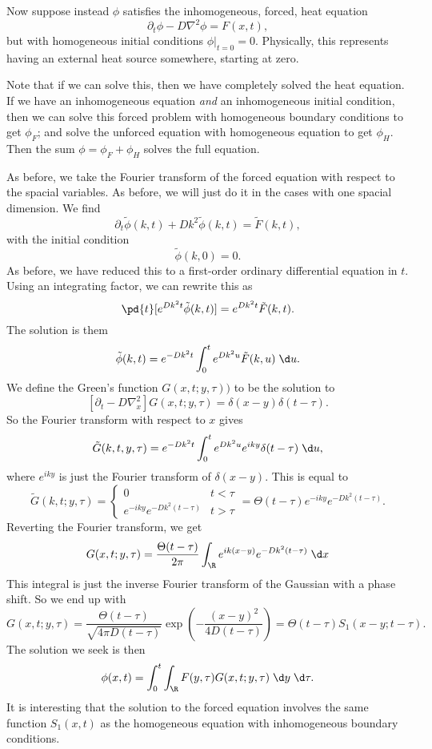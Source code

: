 \documentclass[a4paper]{article}
\begin{document}
Now suppose instead $\phi$ satisfies the inhomogeneous, forced, heat equation
\[
  \partial_t \phi - D \nabla^2 \phi = F(x, t),
\]
but with homogeneous initial conditions $\phi|_{t = 0} = 0$. Physically, this represents having an external heat source somewhere, starting at zero.

Note that if we can solve this, then we have completely solved the heat equation. If we have an inhomogeneous equation \emph{and} an inhomogeneous initial condition, then we can solve this forced problem with homogeneous boundary conditions to get $\phi_F$; and solve the unforced equation with homogeneous equation to get $\phi_H$. Then the sum $\phi = \phi_F + \phi_H$ solves the full equation.

As before, we take the Fourier transform of the forced equation with respect to the spacial variables. As before, we will just do it in the cases with one spacial dimension. We find
\[
  \partial_t \tilde{\phi}(k, t) + Dk^2 \tilde{\phi}(k, t) = \tilde{F}(k, t),
\]
with the initial condition
\[
  \tilde{\phi}(k, 0) = 0.
\]
As before, we have reduced this to a first-order ordinary differential equation in $t$. Using an integrating factor, we can rewrite this as
\[
  \pd{t} [e^{Dk^2 t} \tilde{\phi}(k, t)] = e^{Dk^2 t} \tilde{F}(k, t).
\]
The solution is them
\[
  \tilde{\phi}(k, t) = e^{-Dk^2 t} \int_0^t e^{Dk^2 u} \tilde{F}(k, u)\;\d u.
\]
We define the Green's function $G(x, t; y, \tau))$ to be the solution to
\[
  [\partial_t - D \nabla_x^2] G(x, t; y, \tau) = \delta(x - y) \delta(t - \tau).
\]
So the Fourier transform with respect to $x$ gives
\[
  \tilde{G}(k, t, y, \tau) = e^{-Dk^2 t} \int_0^t e^{D k^2 u}e^{iky}\delta(t - \tau) \;\d u,
\]
where $e^{iky}$ is just the Fourier transform of $\delta(x - y)$. This is equal to
\[
  \tilde{G}(k, t; y, \tau) =
  \begin{cases}
    0 & t < \tau\\
    e^{-iky} e^{-Dk^2 (t - \tau)} & t > \tau
  \end{cases}
  = \Theta(t - \tau) e^{-iky} e^{-Dk^2 (t - \tau)}.
\]
Reverting the Fourier transform, we get
\[
  G(x, t; y, \tau) = \frac{\Theta(t - \tau)}{2\pi} \int_\R e^{ik(x - y)} e^{-Dk^2(t - \tau)}\;\d x
\]
This integral is just the inverse Fourier transform of the Gaussian with a phase shift. So we end up with
\[
  G(x, t; y, \tau) = \frac{\Theta(t - \tau)}{\sqrt{4\pi D(t- \tau)}} \exp\left(-\frac{(x - y)^2}{4D (t - \tau)}\right) = \Theta(t - \tau) S_1 (x - y; t - \tau).
\]
The solution we seek is then
\[
  \phi(x, t) = \int_0^t \int_\R F(y, \tau) G(x, t; y, \tau)\;\d y\;\d \tau.
\]
It is interesting that the solution to the forced equation involves the same function $S_1(x, t)$ as the homogeneous equation with inhomogeneous boundary conditions.
\end{document}
